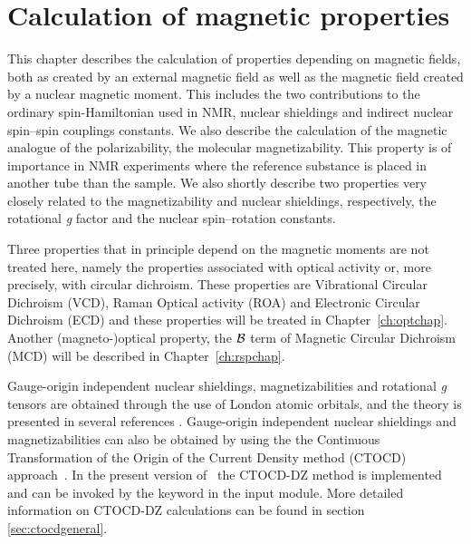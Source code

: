 \chapter{Calculation of magnetic properties}\label{ch:magnetic}

This chapter describes the calculation of properties depending on
magnetic fields, both as created by an external magnetic field as well
as the magnetic field created by a nuclear magnetic moment.
This includes the two
contributions to the ordinary spin-Hamiltonian used in NMR, nuclear
shieldings and indirect nuclear spin--spin
couplings constants. We
also describe the calculation of the magnetic analogue of the
polarizability, the molecular
magnetizability. This property
is of importance in NMR experiments where the reference substance is placed
in another tube than the sample. We also shortly describe
two properties very closely related to the magnetizability and nuclear
shieldings, respectively, the rotational {\em g} factor
and the nuclear spin--rotation constants.

Three properties that in principle depend on the %
magnetic moments are
not treated here, namely the properties associated with optical
activity or, more precisely, with circular dichroism. These
properties are Vibrational Circular Dichroism
(VCD), Raman
Optical activity (ROA) and
Electronic Circular Dichroism (ECD) and these properties will be treated in
Chapter~\ref{ch:optchap}. 
Another (magneto-)optical property, the ${\cal{B}}$ term of
Magnetic Circular Dichroism (MCD) will be described in
Chapter~\ref{ch:rspchap}.

Gauge-origin
independent nuclear shieldings,
magnetizabilities and rotational {\em g} tensors are
obtained through the use of London atomic orbitals, and the theory is
presented in several references
\cite{kwjfhppjacs112,krthrkpjklbhjajjcp100,krthklbpjhjajjcp99,krthklbpjjocp195}.
Gauge-origin independent nuclear shieldings and
magnetizabilities can also be obtained by using the 
the Continuous Transformation of the Origin of the Current Density method (CTOCD)
 approach~\cite{paololazz1,paololazz2,ctocd}. In the present
version of \dalton\ the CTOCD-DZ method is implemented and can be invoked by
the keyword  in the  input module.
More detailed information on CTOCD-DZ calculations can be found in section
\ref{sec:ctocdgeneral}. 


